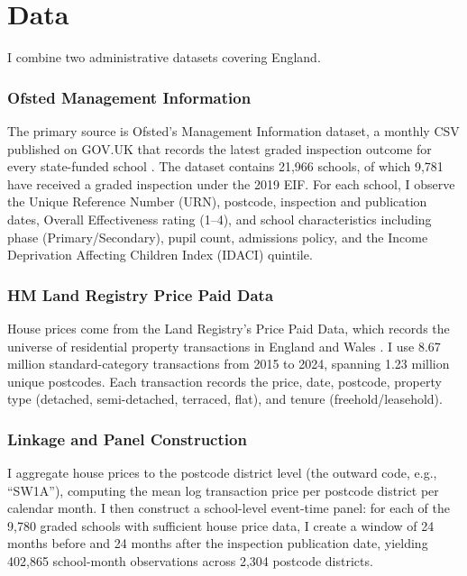\documentclass[12pt]{article}
\begin{document}
\section{Data}

I combine two administrative datasets covering England.

\subsubsection*{Ofsted Management Information} The primary source is Ofsted's Management Information dataset, a monthly CSV published on GOV.UK that records the latest graded inspection outcome for every state-funded school \citep{ofsted2026mi}. The dataset contains 21,966 schools, of which 9,781 have received a graded inspection under the 2019 EIF. For each school, I observe the Unique Reference Number (URN), postcode, inspection and publication dates, Overall Effectiveness rating (1--4), and school characteristics including phase (Primary/Secondary), pupil count, admissions policy, and the Income Deprivation Affecting Children Index (IDACI) quintile.

\subsubsection*{HM Land Registry Price Paid Data} House prices come from the Land Registry's Price Paid Data, which records the universe of residential property transactions in England and Wales \citep{landregistry2026ppd}. I use 8.67 million standard-category transactions from 2015 to 2024, spanning 1.23 million unique postcodes. Each transaction records the price, date, postcode, property type (detached, semi-detached, terraced, flat), and tenure (freehold/leasehold).

\subsubsection*{Linkage and Panel Construction} I aggregate house prices to the postcode district level (the outward code, e.g., ``SW1A''), computing the mean log transaction price per postcode district per calendar month. I then construct a school-level event-time panel: for each of the 9,780 graded schools with sufficient house price data, I create a window of 24 months before and 24 months after the inspection publication date, yielding 402,865 school-month observations across 2,304 postcode districts.
\end{document}
